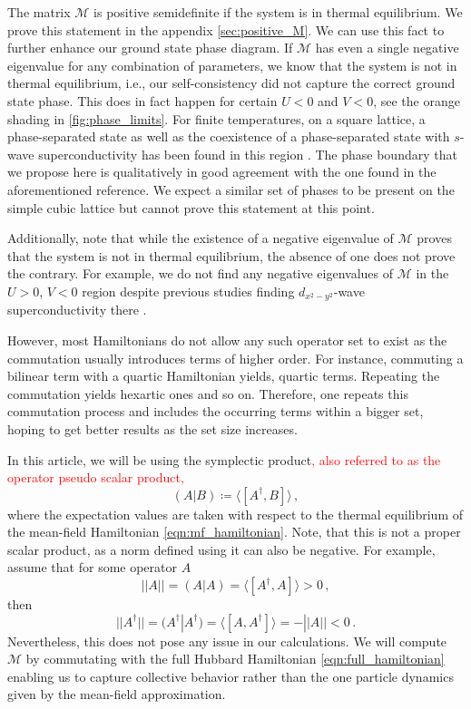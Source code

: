 \documentclass[
    reprint, 
    aps,
    preprintnumbers,
    twocolumn,
    prb,
    superscriptaddress
]{revtex4-2}
\newcommand{\mM}{\mathcal{M}}
\begin{document}
The matrix $\mM$ is positive semidefinite if the system is in thermal equilibrium.
We prove this statement in the appendix \ref{sec:positive_M}.
We can use this fact to further enhance our ground state phase diagram.
If $\mM$ has even a single negative eigenvalue for any combination of parameters, we know that the system is not in thermal equilibrium, 
i.e., our self-consistency did not capture the correct ground state phase.
This does in fact happen for certain $U<0$ and $V<0$, see the orange shading in \autoref{fig:phase_limits}.
For finite temperatures, on a square lattice, a phase-separated state as well as the coexistence of a phase-separated state with $s$-wave superconductivity has been found in this region \cite{Linner23}.
The phase boundary that we propose here is qualitatively in good agreement with the one found in the aforementioned reference.
We expect a similar set of phases to be present on the simple cubic lattice but cannot prove this statement at this point.

Additionally, note that while the existence of a negative eigenvalue of $\mM$ proves that the system is not in thermal equilibrium, the absence of one does not prove the contrary.
For example, we do not find any negative eigenvalues of $\mM$ in the $U>0$, $V<0$ region despite previous studies finding $d_{x^2 - y^2}$-wave superconductivity there \cite{Micnas88b,Huang13}.

However, most Hamiltonians do not allow any such operator set to exist as the commutation usually introduces terms of higher order.
For instance, commuting a bilinear term with a quartic Hamiltonian yields, quartic terms. Repeating the commutation yields hexartic ones and so on.
Therefore, one repeats this commutation process and includes the occurring terms within a bigger set,
hoping to get better results as the set size increases.

In this article, we will be using the symplectic product\textcolor{red}{, also referred to as the operator pseudo scalar product,}
\begin{equation}
\label{eqn:scalar_product}
    (A | B) \coloneqq  \langle [A^\dagger, B] \rangle\,,
\end{equation}
where the expectation values are taken with respect to the thermal equilibrium of the mean-field Hamiltonian \eqref{eqn:mf_hamiltonian}.
Note, that this is not a proper scalar product, as a norm defined using it can also be negative.
For example, assume that for some operator $A$
\begin{equation}
    ||A|| = (A | A) = \langle [A^\dagger, A] \rangle > 0\,,
\end{equation}
then
\begin{equation}
    ||A^\dagger|| = (A^\dagger | A^\dagger) = \langle [A, A^\dagger] \rangle = - ||A|| < 0\,.
\end{equation}
Nevertheless, this does not pose any issue in our calculations.
We will compute $\mM$ by commutating with the full Hubbard Hamiltonian \eqref{eqn:full_hamiltonian} enabling us to capture collective behavior rather than the one particle dynamics given by the mean-field approximation.
\end{document}
